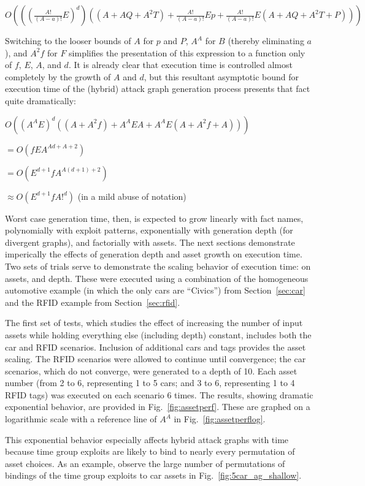 $O(((\frac{A!}{(A-a)!}E)^d)((A+AQ + A^2T) + \frac{A!}{(A-a)!}Ep + \frac{A!}{(A-a)!}E(A+AQ + A^2T+P)))$

Switching to the looser bounds of $A$ for $p$ and $P$, $A^A$ for $B$ 
(thereby eliminating $a$), and $A^2f$ for $F$
simplifies the presentation of this expression to a function only of $f$,
$E$, $A$, and $d$. It is already clear that execution time is controlled almost
completely by the growth of $A$ and $d$, but this resultant asymptotic bound for
execution time of the (hybrid) attack graph generation process presents that 
fact quite dramatically:

$O((A^AE)^d((A+A^2f) + A^AEA + A^AE(A+A^2f+A)))$

$= O(fEA^{Ad+A+2})$

$= O(E^{d+1}fA^{A(d+1)+2})$

$\approx O(E^{d+1}fA!^{d})$ (in a mild abuse of notation)

Worst case generation time, then, is expected to grow linearly with fact names, 
polynomially with exploit patterns, exponentially with generation depth (for divergent 
graphs), and factorially with assets. The next sections demonstrate imperically
the effects of generation depth and asset growth on execution time.
Two sets of trials serve to demonstrate the scaling behavior of execution time:
on assets, and depth. These were executed using a combination of the 
homogeneous automotive example (in which the only cars are ``Civics'') from
Section~\ref{sec:car} and the RFID example from Section~\ref{sec:rfid}.

The first set of tests, which studies the effect of increasing the number of 
input assets while holding everything else (including depth) constant,
includes both the car and RFID scenarios. Inclusion of additional cars and
tags provides the asset scaling. The RFID scenarios were allowed to continue
until convergence; the car scenarios, which do not converge, were generated
to a depth of 10. Each asset number (from 2 to 6, representing 1 to 5 cars; and
3 to 6, representing 1 to 4 RFID tags) was executed on each scenario 6 times.
The results, showing dramatic exponential behavior, are provided in 
Fig.~\ref{fig:assetperf}. These are graphed on a logarithmic scale with a
reference line of $A^A$ in Fig.~\ref{fig:assetperflog}.

This exponential behavior especially affects hybrid attack graphs with time 
because time group exploits are likely to bind to nearly every permutation of 
asset choices. As an example, observe the large number of permutations of 
bindings of the time group exploits to car assets in 
Fig.~\ref{fig:5car_ag_shallow}.

